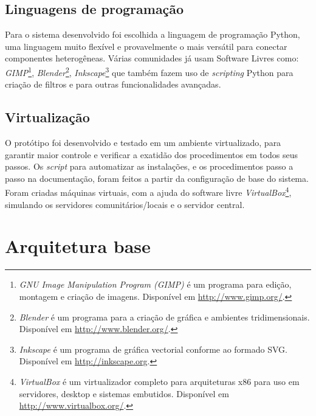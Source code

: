 \subsection{Linguagens de programação}
Para o sistema desenvolvido foi escolhida a linguagem de programação
Python, uma linguagem muito flexível e provavelmente o mais versátil
para conectar componentes heterogêneas. Várias comunidades já usam
Software Livres como: \emph{GIMP}\footnote{\emph{GNU Image
    Manipulation Program (GIMP)} é um programa para edição, montagem e
  criação de imagens. Disponível em \url{http://www.gimp.org/}.},
\emph{Blender}\footnote{\emph{Blender} é um programa para a criação de
  gráfica e ambientes tridimensionais. Disponível em
  \url{http://www.blender.org/}.},
\emph{Inkscape}\footnote{\emph{Inkscape} é um programa de gráfica
  vectorial conforme ao formado SVG. Disponível em
  \url{http://inkscape.org}.} que também fazem uso de \emph{scripting}
Python para criação de filtros e para outras funcionalidades
avançadas.

\subsection{Virtualização}
O protótipo foi desenvolvido e testado em um ambiente virtualizado,
para garantir maior controle e verificar a exatidão dos procedimentos
em todos seus passos. Os \emph{script} para automatizar as
instalações, e os procedimentos passo a passo na documentação, foram
feitos a partir da configuração de base do sistema. Foram criadas
máquinas virtuais, com a ajuda do software livre
\emph{VirtualBox}\footnote{\emph{VirtualBox} é um virtualizador
  completo para arquiteturas x86 para uso em servidores, desktop e
  sistemas embutidos. Disponível em
  \url{http://www.virtualbox.org/}.}, simulando os servidores
comunitários/locais e o servidor central.

\section{Arquitetura base}

